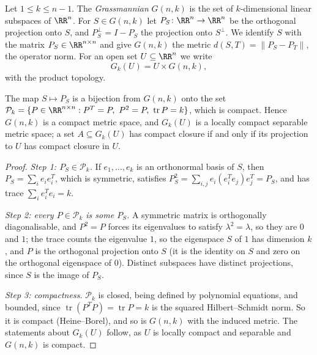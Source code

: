 \begin{definition}\label{currents:definition-grassmannian}
Let $1 \leq k \leq n - 1$. The \emph{Grassmannian} $G(n, k)$ is the set of $k$-dimensional linear subspaces of $\RR^n$. For $S \in G(n, k)$ let $P_S \colon \RR^n \to \RR^n$ be the orthogonal projection onto
$S$, and $P_S^\perp = I - P_S$ the projection onto $S^\perp$. We identify $S$ with the matrix $P_S \in \RR^{n \times n}$ and give $G(n, k)$ the metric $d(S, T) = \|P_S - P_T\|$, the operator norm. For an
open set $U \subseteq \RR^n$ we write
\[
G_k(U) = U \times G(n, k),
\]
with the product topology.
\end{definition}

\begin{lemma}\label{currents:lemma-grassmannian-compact}
The map $S \mapsto P_S$ is a bijection from $G(n, k)$ onto the set $\mathcal{P}_k = \{P \in \RR^{n \times n} : P^T = P,\ P^2 = P,\ \operatorname{tr}P = k\}$, which is compact. Hence $G(n, k)$ is a compact metric
space, and $G_k(U)$ is a locally compact separable metric space; a set $A \subseteq G_k(U)$ has compact closure if and only if its projection to $U$ has compact closure in $U$.
\end{lemma}

\begin{proof}
\emph{Step 1: $P_S \in \mathcal{P}_k$.} If $e_1, \ldots, e_k$ is an orthonormal basis of $S$, then $P_S = \sum_ie_ie_i^T$, which is symmetric, satisfies $P_S^2 = \sum_{i, j}e_i(e_i^Te_j)e_j^T = P_S$, and has
trace $\sum_ie_i^Te_i = k$.

\emph{Step 2: every $P \in \mathcal{P}_k$ is some $P_S$.} A symmetric matrix is orthogonally diagonalisable, and $P^2 = P$ forces its eigenvalues to satisfy $\lambda^2 = \lambda$, so they are $0$ and $1$; the
trace counts the eigenvalue $1$, so the eigenspace $S$ of $1$ has dimension $k$, and $P$ is the orthogonal projection onto $S$ (it is the identity on $S$ and zero on the orthogonal eigenspace of $0$).
Distinct subspaces have distinct projections, since $S$ is the image of $P_S$.

\emph{Step 3: compactness.} $\mathcal{P}_k$ is closed, being defined by polynomial equations, and bounded, since $\operatorname{tr}(P^TP) = \operatorname{tr}P = k$ is the squared Hilbert--Schmidt norm.
So it is compact (Heine--Borel), and so is $G(n, k)$ with the induced metric. The statements about $G_k(U)$ follow, as $U$ is locally compact and separable and $G(n, k)$ is compact.
\end{proof}

